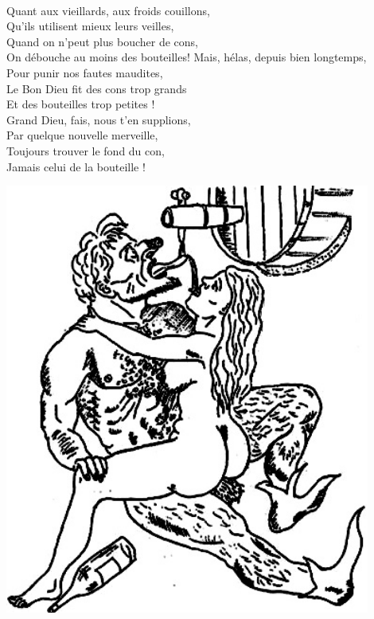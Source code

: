 \\Quant aux vieillards, aux froids couillons,
\\Qu'ils utilisent mieux leurs veilles,
\\Quand on n'peut plus boucher de cons,
\\On débouche au moins des bouteilles! \bissimple
\breakpage
Mais, hélas, depuis bien longtemps,
\\Pour punir nos fautes maudites,
\\Le Bon Dieu fit des cons trop grands
\\Et des bouteilles trop petites !
\\Grand Dieu, fais, nous t'en supplions,
\\Par quelque nouvelle merveille,
\\Toujours trouver le fond du con,
\\Jamais celui de la bouteille ! \bissimple
\bigskip
\begin{center}
\includegraphics[width=0.9\textwidth]{images/le_con_et_la_bouteille.jpg}
\end{center}

\breakpage